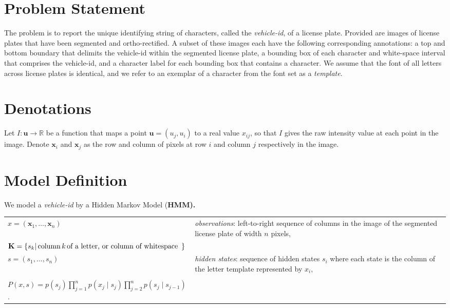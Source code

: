 \documentclass[a4paper,12pt]{article}
\newcounter{ohNoteCounter}
\newcommand{\ohnote}[1]{{\scriptsize  \color{Cgreen} $\clubsuit$~\refstepcounter{ohNoteCounter}\textsf{[OH]$_{\arabic{ohNoteCounter}}$:{#1}}}}
\renewcommand{\ohnote}[1]{}
\begin{document}
\pagestyle{empty} \ohnote{This is useful way to leave notes. Both of
  us have command tu leave notes. I have \textbackslash ohnote, you
  have \textbackslash jpnote. Notes in whole document can be disabled
  by creating file with name ``.notes\_disabled''. }

\section{Problem Statement}
The problem is to report the unique identifying string of characters,
called the \emph{vehicle-id}, of a license plate.  Provided are images
of license plates that have been segmented and ortho-rectified. A
subset of these images each have the following corresponding
annotations: a top and bottom boundary that delimits the vehicle-id
within the segmented license plate, a bounding box of each character
and white-space interval that comprises the vehicle-id, and a
character label for each bounding box that contains a character.  We
assume that the font of all letters across license plates is
identical, and we refer to an exemplar of a character from the font
set as a \emph{template}.  

\section{Denotations}
Let $I\colon \mathbf{u} \to \mathbb{R}$ be a function that maps a
point $\mathbf{u} = (u_j,u_i)$ to a real value $x_{ij}$, so that $I$
gives the raw intensity value at each point in the image.  Denote
$\mathbf{x}_i$ and $\mathbf{x}_j$ as the row and column of pixels at
row $i$ and column $j$ respectively in the image.

\section{Model Definition}
We model a \emph{vehicle-id} by a Hidden Markov Model
(\bfseries{HMM}).

\begin{tabular}{ ll } 
  $x=(\mathbf{x}_1,\ldots,\mathbf{x}_n)$ & \emph{observations}: left-to-right sequence of columns in the
  image of the segmented license plate of width $n$ pixels,\\
  $\mathbf{K} = \{ s_k | \text{\,column\,} k \text{\,of a letter, or column of whitespace \,}\}$  \\
  $s=(s_1,\ldots,s_n)$ & \emph{hidden states}: sequence of hidden states $s_i$ where each state
  is the column of the letter template represented by $x_i$, \\
  \multicolumn{2}{|c|}{} \\
  $P(x,s)=p(s_j)\prod_{j=1}^{n} p(x_j \mid s_j)\prod_{j=2}^{n} p(s_j \mid s_{j-1})$.
\end{tabular}
\end{document}
